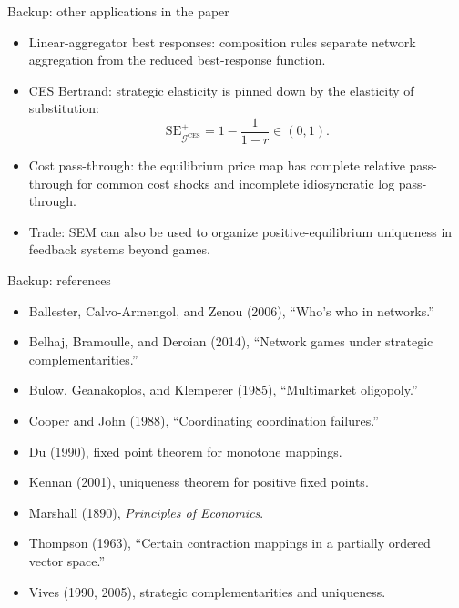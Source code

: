 \documentclass[11pt,aspectratio=169]{beamer}
\theoremstyle{plain}
\theoremstyle{definition}
\newenvironment{wideitemize}
  {\begin{itemize}\setlength{\itemsep}{0.72em}}
  {\end{itemize}}
\newcommand{\0}{\mathbf{0}}
\newcommand{\SE}{\mathrm{SE}}
\begin{document}
\begin{frame}[label=backup-other-applications]{Backup: other applications in the paper}
\small
\begin{wideitemize}
    \item \alert{Linear-aggregator best responses}: composition rules separate
    network aggregation from the reduced best-response function.
    \item \alert{CES Bertrand}: strategic elasticity is pinned down by the
    elasticity of substitution:
    \[
    \SE_{\mathcal G^{\mathrm{CES}}}^+
    =
    1-\frac{1}{1-r}
    \in(0,1).
    \]
    \item \alert{Cost pass-through}: the equilibrium price map has complete
    relative pass-through for common cost shocks and incomplete idiosyncratic
    log pass-through.
    \item \alert{Trade}: SEM can also be used to organize positive-equilibrium
    uniqueness in feedback systems beyond games.
\end{wideitemize}
\end{frame}

\begin{frame}{Backup: references}
\footnotesize
\begin{wideitemize}
    \item Ballester, Calvo-Armengol, and Zenou (2006), ``Who's who in networks.''
    \item Belhaj, Bramoulle, and Deroian (2014), ``Network games under strategic complementarities.''
    \item Bulow, Geanakoplos, and Klemperer (1985), ``Multimarket oligopoly.''
    \item Cooper and John (1988), ``Coordinating coordination failures.''
    \item Du (1990), fixed point theorem for monotone mappings.
    \item Kennan (2001), uniqueness theorem for positive fixed points.
    \item Marshall (1890), \textit{Principles of Economics}.
    \item Thompson (1963), ``Certain contraction mappings in a partially ordered vector space.''
    \item Vives (1990, 2005), strategic complementarities and uniqueness.
\end{wideitemize}
\end{frame}
\end{document}
